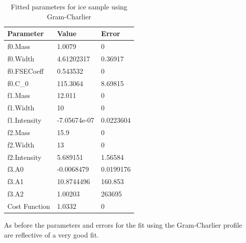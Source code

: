 \documentclass[a4paper]{article}
\begin{document}
\begin{table}[h!]
  \centering
  \begin{tabular}{lll}
    \toprule
    Parameter     & Value        & Error     \\
    \midrule
    f0.Mass       & 1.0079       & 0         \\
    f0.Width      & 4.61202317   & 0.36917   \\
    f0.FSECoeff   & 0.543532     & 0         \\
    f0.C\_0       & 115.3064     & 8.69815   \\
    f1.Mass       & 12.011       & 0         \\
    f1.Width      & 10           & 0         \\
    f1.Intensity  & -7.05674e-07 & 0.0223604 \\
    f2.Mass       & 15.9         & 0         \\
    f2.Width      & 13           & 0         \\
    f2.Intensity  & 5.689151     & 1.56584   \\
    f3.A0         & -0.0068479   & 0.0199176 \\
    f3.A1         & 10.8744496   & 160.853   \\
    f3.A2         & 1.00203      & 263695    \\
    Cost Function & 1.0332       & 0         \\
    \bottomrule
  \end{tabular}
  \caption{Fitted parameters for ice sample using Gram-Charlier}
  \label{tab:gc_ice_params}
\end{table}
\FloatBarrier

As before the parameters and errors for the fit using the Gram-Charlier profile
are reflective of a very good fit.
\end{document}
